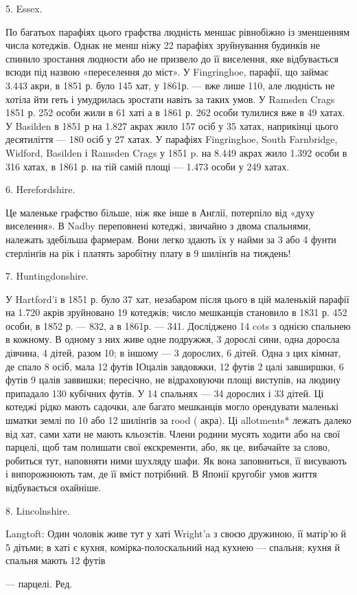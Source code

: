 5. Essex.

По багатьох парафіях цього графства людність меншає рівнобіжно
із зменшенням числа котеджів. Однак не менш ніжу
22 парафіях зруйнування будинків не спинило зростання людности
або не призвело до її виселення, яке відбувається всюди під
назвою «переселення до міст». У Fingringhoe, парафії, що займає
3.443 акри, в 1851 р. було 145 хат, у 1861р. — вже лише 110, але
людність не хотіла йти геть і умудрилась зростати навіть за
таких умов. У Ramsden Crags 1851 р. 252 особи жили в 61 хаті
а в 1861 р. 262 особи тулилися вже в 49 хатах. У Basilden в 1851 р
на 1.827 акрах жило 157 осіб у 35 хатах, наприкінці цього десятиліття
— 180 осіб у 27 хатах. У парафіях Fingringhoe, South
Farnbridge, Widford, Basilden і Ramsden Crags у 1851 p. на
8.449 акрах жило 1.392 особи в 316 хатах, в 1861 р. на тій самій
площі — 1.473 особи у 249 хатах.

6. Herefordshire.

Це маленьке графство більше, ніж яке інше в Англії, потерпіло
від «духу виселення». В Nadby переповнені котеджі,
звичайно з двома спальнями, належать здебільша фармерам.
Вони легко здають їх у найми за 3 або 4 фунти стерлінґів на рік
і платять заробітну плату в 9 шилінґів на тиждень!

7. Huntingdonshire.

У Hartford’i в 1851 р. було 37 хат, незабаром після цього
в цій маленькій парафії на 1.720 акрів зруйновано 19 котеджів;
число мешканців становило в 1831 р. 452 особи, в 1852 р. — 832,
а в 1861р. — 341. Досліджено 14 cots з однією спальнею в кожному.
В одному з них живе одне подружжя, 3 дорослі сини, одна
доросла дівчина, 4 дітей, разом 10; в іншому — 3 дорослих,
6 дітей. Одна з цих кімнат, де спало 8 осіб, мала 12 футів ІОцалів
завдовжки, 12 футів 2 цалі завширшки, 6 футів 9 цалів заввишки;
пересічно, не відраховуючи площі виступів, на людину припадало
130 кубічних футів. У 14 спальнях — 34 дорослих і 33 дітей. Ці
котеджі рідко мають садочки, але багато мешканців могло орендувати
маленькі шматки землі по 10 або 12 шилінґів за rood ( акра).
Ці allotments* лежать далеко від хат, сами хати не мають кльозєтів.
Члени родини мусять ходити або на свої парцелі, щоб там
полишати свої екскременти, або, як це, вибачайте за слово, робиться
тут, наповняти ними шухляду шафи. Як вона заповниться,
її висувають і випорожнюють там, де її вміст потрібний. В Японії
кругобіг умов життя відбувається охайніше.

8. Lincolnshire.

Langtoft: Один чоловік живе тут у хаті Wright’a з своєю дружиною,
її матір’ю й 5 дітьми; в хаті є кухня, комірка-полоскальний
над кухнею — спальня; кухня й спальня мають 12 футів

— парцелі. Ред.
